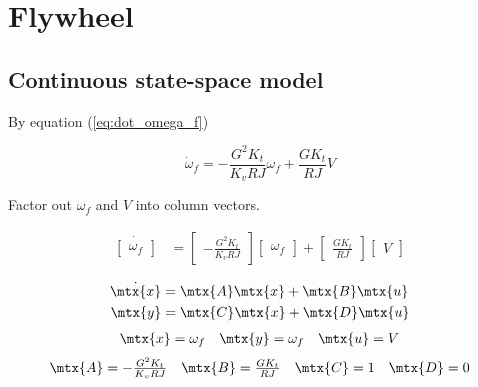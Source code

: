 \section{Flywheel}
\label{sec:ss_model_flywheel}

\subsection{Continuous state-space model}

By equation (\ref{eq:dot_omega_f})

\begin{equation*}
  \dot{\omega}_f = -\frac{G^2 K_t}{K_v RJ} \omega_f + \frac{G K_t}{RJ} V
\end{equation*}

Factor out $\omega_f$ and $V$ into column vectors.

\begin{align*}
  \dot{\begin{bmatrix}
    \omega_f
  \end{bmatrix}} &=
  \begin{bmatrix}
    -\frac{G^2 K_t}{K_v RJ}
  \end{bmatrix}
  \begin{bmatrix}
    \omega_f
  \end{bmatrix} +
  \begin{bmatrix}
    \frac{GK_t}{RJ}
  \end{bmatrix}
  \begin{bmatrix}
    V
  \end{bmatrix}
\end{align*}

\begin{theorem}
  \begin{align*}
    \dot{\mtx{x}} &= \mtx{A} \mtx{x} + \mtx{B} \mtx{u} \\
    \mtx{y} &= \mtx{C} \mtx{x} + \mtx{D} \mtx{u}
  \end{align*}
  \begin{equation*}
    \begin{array}{ccc}
      \mtx{x} = \omega_f &
      \mtx{y} = \omega_f &
      \mtx{u} = V
    \end{array}
  \end{equation*}
  \begin{equation}
    \begin{array}{cccc}
      \mtx{A} = -\frac{G^2 K_t}{K_v RJ} &
      \mtx{B} = \frac{G K_t}{RJ} &
      \mtx{C} = 1 &
      \mtx{D} = 0
    \end{array}
  \end{equation}
\end{theorem}

